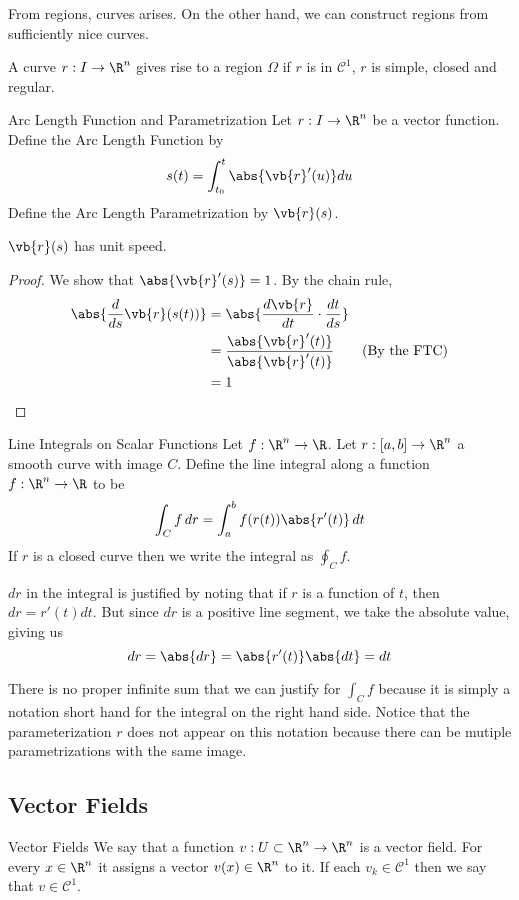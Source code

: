 \documentclass[a4paper]{article}
\begin{document}
From regions, curves arises. On the other hand, we can construct regions from sufficiently nice curves. 

\begin{prp}{}{} A curve $r:I\to\R^n$ gives rise to a region $\Omega$ if $r$ is in $\mathcal{C}^1$, $r$ is simple, closed and regular. 
\end{prp}

\begin{defn}{Arc Length Function and Parametrization}{} Let $r:I\to\R^n$ be a vector function. Define the Arc Length Function by $$s(t)=\int_{t_0}^{t}\abs{\vb{r}'(u)}du$$ Define the Arc Length Parametrization by $\vb{r}(s)$. 
\end{defn}

\begin{lmm}{}{} $\vb{r}(s)$ has unit speed. \tcbline
\begin{proof} We show that $\abs{\vb{r}'(s)}=1$. By the chain rule, 
\begin{align*}
\abs{\frac{d}{ds}\vb{r}(s(t))}&=\abs{\frac{d\vb{r}}{dt}\cdot\frac{dt}{ds}}\\
&=\frac{\abs{\vb{r}'(t)}}{\abs{\vb{r}'(t)}}\tag{By the FTC}\\
&=1
\end{align*}
\end{proof}
\end{lmm}

\begin{defn}{Line Integrals on Scalar Functions}{} Let $f:\R^n\to\R$. Let $r:[a,b]\to\R^n$ a smooth curve with image $C$. Define the line integral along a function $f:\R^n\to\R$ to be $$\int_Cf\,dr=\int_a^bf(r(t))\abs{r'(t)}\,dt$$ If $r$ is a closed curve then we write the integral as $\oint_Cf$. 
\end{defn}

$dr$ in the integral is justified by noting that if $r$ is a function of $t$, then $dr=r'(t)dt$. But since $dr$ is a positive line segment, we take the absolute value, giving us $$dr=\abs{dr}=\abs{r'(t)}\abs{dt}=dt$$

There is no proper infinite sum that we can justify for $\int_Cf$ because it is simply a notation short hand for the integral on the right hand side. Notice that the parameterization $r$ does not appear on this notation because there can be mutiple parametrizations with the same image. 

\subsection{Vector Fields}
\begin{defn}{Vector Fields}{} We say that a function $v:U\subset\R^n\to\R^n$ is a vector field. For every $x\in\R^n$ it assigns a vector $v(x)\in\R^n$ to it. If each $v_k\in\mathcal{C}^1$ then we say that $v\in\mathcal{C}^1$. 
\end{defn}
\end{document}

